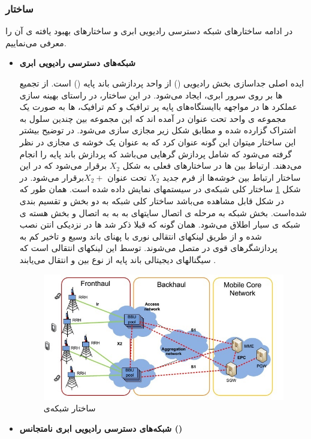 \subsubsection{ساختار }
در ادامه ساختارهای شبکه دسترسی رادیویی ابری و ساختارهای بهبود یافته ی آن را معرفی می‌نماییم.
\begin{itemize}
\item \textbf{شبکه‌های دسترسی رادیویی ابری}


ایده اصلی  جداسازی بخش رادیویی () 
 از واحد پردازشی باند پایه ()
  است.
از تجمیع ها بر روی سرور ابری،  ایجاد می‌شود.
در این ساختار، در راستای بهینه سازی عملکرد 
ها در مواجهه باایستگاه‌های پایه پر ترافیک و کم ترافیک،
 ها به صورت یک مجموعه ی واحد تحت عنوان 
 در آمده اند که این مجموعه بین چندین سلول 
 به اشتراک گزارده شده و مطابق شکل زیر مجازی سازی
می‌شود. 
در توضیح بیشتر این ساختار میتوان این گونه
عنوان کرد که  به عنوان یک خوشه ی مجازی
در نظر گرفته می‌شود که شامل پردازش گرهایی می‌باشد
که پردازش‌‌ باند پایه را انجام می‌دهند. ارتباط بین
  ها در ساختارهای فعلی به شکل  $X_2$ برقرار می‌شود
که در این ساختار ارتباط بین خوشه‌ها از فرم جدید $X_2$
تحت عنوان  $X_2 +$برقرار می‌شود.
\newline
در شکل \ref{fig:C-RAN} ساختار کلی شبکه‌ی   در سیستمهای
 نمایش داده شده است. همان طور که در شکل قابل
مشاهده می‌باشد ساختار کلی شبکه   به دو بخش
  و  تقسیم بندی شده‌است. بخش
 شبکه به مرحله ی اتصال سایتهای به
 به  به اتصال  و بخش 
هسته ی شبکه ی سیار اطلاق می‌شود. همان گونه که قبلا
ذکر شد ها در نزدیکی انتن نصب شده و از طریق
لینکهای انتقالی نوری با پهنای باند وسیع و تاخیر کم به
پردازشگرهای قوی در  متصل می‌شوند. توسط این
لینکهای انتقالی است که سیگنالهای دیجیتالی باند
پایه از نوع  بین  و  انتقال می‌یابند \cite{checko2015cloud}.
\begin{figure}[H]
  \centering
    \includegraphics[width=\textwidth]{./fig/CRAN}
  \caption{ساختار شبکه‌ی  \cite{checko2015cloud}}
  \label{fig:C-RAN}
\end{figure}
\item \textbf{شبکه‌های دسترسی رادیویی ابری نامتجانس ()}



\end{itemize}
